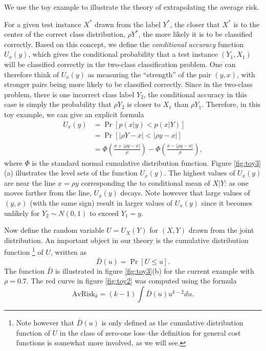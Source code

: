 \documentclass[12pt]{article}
\begin{document}
We use the toy example to illustrate the theory of extrapolating the average
risk.



For a given test instance $X^*$ drawn from the label $Y^*$, the closer
that $X^*$ is to the center of the correct class distribution, $\rho
Y^*$, the more likely it is to be classified correctly.  Based on this
concept, we define the \emph{conditional accuracy} function $U_x(y)$,
which gives the conditional probability that a test instance $(Y_1,
X_1)$ will be classified correctly in the two-class classification
problem.  One can therefore think of $U_x(y)$ as measuring the
``strength'' of the pair $(y, x)$, with stronger pairs being more
likely to be classified correctly.  Since in the two-class problem,
there is one incorrect class label $Y_2$, the conditional accuracy in
this case is simply the probability that $\rho Y_2$ is closer to $X_1$
than $\rho Y_1$.  Therefore, in this toy example, we can give an
explicit formula
\begin{align*}
U_x(y) &= \Pr[p(x|y) < p(x|Y)]
\\&= \Pr[|\rho Y - x|< |\rho y - x|] 
\\&= \Phi\left(\frac{x + |\rho y - x|}{\rho}\right) - \Phi\left(\frac{x - |\rho y - x|}{\rho}\right),
\end{align*}
where $\Phi$ is the standard normal cumulative distribution function.
Figure \ref{fig:toy3}(a) illustrates the level sets of the function
$U_x(y)$.  The highest values of $U_x(y)$ are near the line $x = \rho
y$ corresponding the to conditional mean of $X|Y$: as one moves
farther from the line, $U_x(y)$ decays.  Note however that large
values of $(y, x)$ (with the same sign) result in larger values of
$U_x(y)$ since it becomes unlikely for $Y_2 \sim N(0,1)$ to exceed
$Y_1 = y$.

Now define the random variable $U = U_X(Y)$ for $(X, Y)$ drawn from
the joint distribution.  An important object in our theory is the
cumulative distribution function
\footnote{Note however that $\bar{D}(u)$ is only defined as the cumulative
distribution function of $U$ in the class of zero-one loss--the
definition for general cost functions is somewhat more involved, as we
will see.}
of $U$, written as
\[
\bar{D}(u) = \Pr[U \leq u].
\]
The function $\bar{D}$ is illustrated in
figure \ref{fig:toy3}(b) for the current example with $\rho = 0.7$.
The red curve in figure \ref{fig:toy2} was computed using the formula
\[
\text{AvRisk}_k = (k-1) \int \bar{D}(u) u^{k-2} du.
\]
\end{document}
